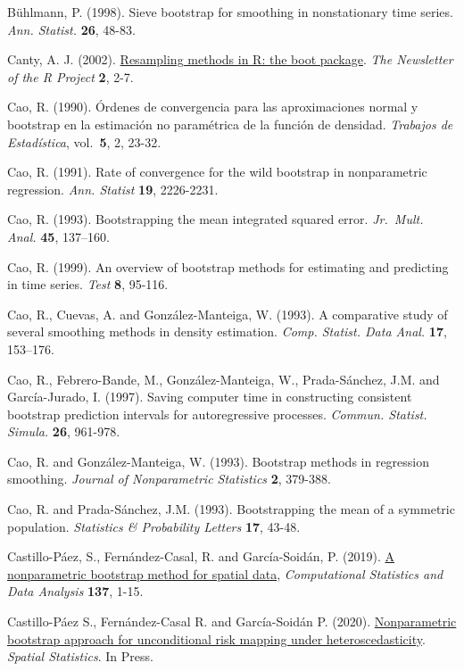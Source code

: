 \documentclass[
]{book}
\theoremstyle{break}
\theoremstyle{definition}
\theoremstyle{definition}
\theoremstyle{definition}
\theoremstyle{definition}
\theoremstyle{remark}
\begin{document}
Bühlmann, P. (1998). Sieve bootstrap for smoothing in nonstationary time
series. \emph{Ann. Statist.} \textbf{26}, 48-83.

Canty, A. J. (2002). \href{http://cran.fhcrc.org/doc/Rnews/Rnews_2002-3.pdf}{Resampling methods in R: the boot package}.
\emph{The Newsletter of the R Project} \textbf{2}, 2-7.

Cao, R. (1990). Órdenes de convergencia para las aproximaciones normal y
bootstrap en la estimación no paramétrica de la función de densidad.
\emph{Trabajos de Estadística}, vol.~\textbf{5}, 2, 23-32.

Cao, R. (1991). Rate of convergence for the wild bootstrap in
nonparametric regression. \emph{Ann. Statist} \textbf{19}, 2226-2231.

Cao, R. (1993). Bootstrapping the mean integrated squared error.
\emph{Jr.~Mult. Anal.} \textbf{45}, 137--160.

Cao, R. (1999). An overview of bootstrap methods for estimating and
predicting in time series. \emph{Test} \textbf{8}, 95-116.

Cao, R., Cuevas, A. and González-Manteiga, W. (1993). A comparative
study of several smoothing methods in density estimation.
\emph{Comp. Statist. Data Anal.} \textbf{17}, 153--176.

Cao, R., Febrero-Bande, M., González-Manteiga, W., Prada-Sánchez, J.M.
and García-Jurado, I. (1997). Saving computer time in constructing
consistent bootstrap prediction intervals for autoregressive processes.
\emph{Commun. Statist. Simula.} \textbf{26}, 961-978.

Cao, R. and González-Manteiga, W. (1993). Bootstrap methods in
regression smoothing. \emph{Journal of Nonparametric Statistics} \textbf{2},
379-388.

Cao, R. and Prada-Sánchez, J.M. (1993). Bootstrapping the mean of a
symmetric population. \emph{Statistics \& Probability Letters} \textbf{17}, 43-48.

Castillo-Páez, S., Fernández-Casal, R. and García-Soidán, P. (2019).
\href{https://www.sciencedirect.com/science/article/pii/S0167947319300325?via\%3Dihub}{A nonparametric bootstrap method for spatial data},
\emph{Computational Statistics and Data Analysis} \textbf{137}, 1-15.

Castillo-Páez S., Fernández-Casal R. and García-Soidán P. (2020).
\href{https://doi.org/10.1016/j.spasta.2019.100389}{Nonparametric bootstrap approach for unconditional risk mapping under heteroscedasticity}.
\emph{Spatial Statistics}. In Press.
\end{document}
